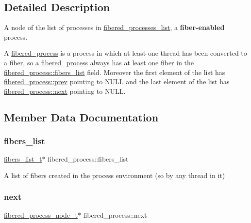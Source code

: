 \subsection{Detailed Description}
A node of the list of processes in \mbox{\hyperlink{structfibered__processes__list}{fibered\+\_\+processes\+\_\+list}}, a {\bfseries fiber-\/enabled} process. 

A \mbox{\hyperlink{structfibered__process}{fibered\+\_\+process}} is a process in which at least one thread has been converted to a fiber, so a \mbox{\hyperlink{structfibered__process}{fibered\+\_\+process}} always has at least one fiber in the \mbox{\hyperlink{structfibered__process_a1aae0be425bbc05b6444909f16ec56b9}{fibered\+\_\+process\+::fibers\+\_\+list}} field. Moreover the first element of the list has \mbox{\hyperlink{structfibered__process_adf5ba8614f416e75bc026fe449fdd08c}{fibered\+\_\+process\+::prev}} pointing to {\ttfamily N\+U\+LL} and the last element of the list has \mbox{\hyperlink{structfibered__process_a8779fb1384900987ccd2d0d9de09a1ab}{fibered\+\_\+process\+::next}} pointing to {\ttfamily N\+U\+LL}. 

\subsection{Member Data Documentation}
\mbox{\label{structfibered__process_a1aae0be425bbc05b6444909f16ec56b9}} 
\subsubsection{\texorpdfstring{fibers\+\_\+list}{fibers\_list}}
{\footnotesize\ttfamily \mbox{\hyperlink{core_8h_aad42420053a7ace7b3fb17805d6e9004}{fibers\+\_\+list\+\_\+t}}$\ast$ fibered\+\_\+process\+::fibers\+\_\+list}

A list of fibers created in the process environment (so by any thread in it) \mbox{\label{structfibered__process_a8779fb1384900987ccd2d0d9de09a1ab}} 
\subsubsection{\texorpdfstring{next}{next}}
{\footnotesize\ttfamily \mbox{\hyperlink{core_8h_aa16708c717e33e5e95614cd1e4ca7b2b}{fibered\+\_\+process\+\_\+node\+\_\+t}}$\ast$ fibered\+\_\+process\+::next}

